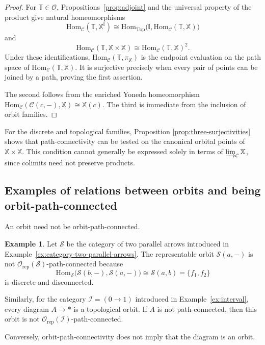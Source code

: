 \documentclass[12pt]{amsart}
\theoremstyle{definition}
\newtheorem{ex}[teo]{Example}
\theoremstyle{remark}
\numberwithin{figure}{section}%
\newcommand{\CC}{\mathcal{C}}
\newcommand{\Top}{\mathrm{Top}}
\newcommand{\X}{\mathbb{X}}
\newcommand{\T}{\mathbb{T}}
\newcommand{\Hom}{\mathrm{Hom}}
\begin{document}
\begin{proof}
For $\T\in\mathcal O$, Propositions~\ref{prop:adjoint} and
the universal property of the product give natural homeomorphisms
\[
\Hom_{\CC}(\T,\X^{\mathbb I})
\cong
\Hom_{\Top}\bigl(\mathbb I,\Hom_{\CC}(\T,\X)\bigr)
\]
and
\[
\Hom_{\CC}(\T,\X\times\X)
\cong
\Hom_{\CC}(\T,\X)^2.
\]
Under these identifications, $\Hom_{\CC}(\T,\pi_{\X})$ is the endpoint
evaluation on the path space of $\Hom_{\CC}(\T,\X)$. It is surjective
precisely when every pair of points can be joined by a path, proving the
first assertion.

The second follows from the enriched Yoneda homeomorphism
$\allowbreak\Hom_{\CC}\allowbreak(\CC(c,-),\allowbreak \X)\allowbreak \cong \allowbreak \X(c)$. The third is immediate from the
inclusion of orbit families.
\end{proof}

For the discrete and topological families, Proposition
\ref{prop:three-surjectivities} shows that path-connectivity can be
tested on the canonical orbital points of $\X\times\X$. This condition
cannot generally be expressed solely in terms of
$\varinjlim_{\CC}\X$, since colimits need not preserve products.

\subsection{Examples of relations between orbits and being orbit-path-connected}
   
An orbit need not be orbit-path-connected.

\begin{ex}
\label{ex:representable-not-connected}
\label{ex:arrow-orbit-not-connected}
Let $\mathcal S$ be the category of two parallel arrows introduced in Example~\ref{ex:category-two-parallel-arrows}. The
representable orbit $\mathcal S(a,-)$ is not
$\mathcal O_{\mathrm{rep}}(\mathcal S)$-path-connected because
\[
\Hom_{\mathcal S}
\bigl(\mathcal S(b,-),\mathcal S(a,-)\bigr)
\cong
\mathcal S(a,b)=\{f_1,f_2\}
\]
is discrete and disconnected.

Similarly, for the category $\mathcal I=(0\to1)$ introduced in Example~\ref{ex:interval}, every diagram
$A\to *$ is a topological orbit. If $A$ is not path-connected, then
this orbit is not
$\mathcal O_{\mathrm{rep}}(\mathcal I)$-path-connected.
\end{ex}

Conversely, orbit-path-connectivity does not imply that the diagram is an
orbit.
\end{document}
